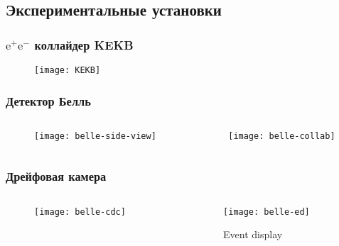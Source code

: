 \subsection{Экспериментальные установки}
\begin{frame}
    \frametitle{$\text{e}^+\text{e}^-$ коллайдер KEKB}
    \begin{figure}
    \texttt{[image: KEKB]}
    \end{figure}
\end{frame}

\begin{frame}
    \frametitle{Детектор Белль}
    \begin{columns}
        \begin{column}{0.5\textwidth}
            \begin{figure}
            \texttt{[image: belle-side-view]}
            \end{figure}
        \end{column}
        \begin{column}{0.5\textwidth}
            \begin{figure}
            \texttt{[image: belle-collab]}
            \end{figure}
        \end{column}
    \end{columns}
\end{frame}
\begin{frame}
    \frametitle{Дрейфовая камера}
    \begin{columns}
        \begin{column}{0.5\textwidth}
            \begin{figure}
            \texttt{[image: belle-cdc]}
            \end{figure}
        \end{column}
        \begin{column}{0.5\textwidth}
            \begin{figure}
            \texttt{[image: belle-ed]}
            \caption{Event display}
            \end{figure}
        \end{column}
    \end{columns}
\end{frame}
